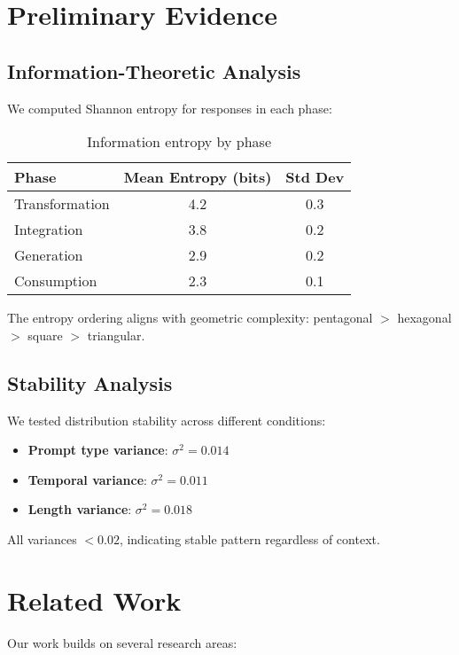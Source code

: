 \documentclass[pmlr,onecolumn]{jmlr}
\begin{document}
\section{Preliminary Evidence}

\subsection{Information-Theoretic Analysis}

We computed Shannon entropy for responses in each phase:

\begin{table}[h]
\centering
\begin{tabular}{lcc}
\hline
\textbf{Phase} & \textbf{Mean Entropy (bits)} & \textbf{Std Dev} \\
\hline
Transformation & 4.2 & 0.3 \\
Integration & 3.8 & 0.2 \\
Generation & 2.9 & 0.2 \\
Consumption & 2.3 & 0.1 \\
\hline
\end{tabular}
\caption{Information entropy by phase}
\end{table}

The entropy ordering aligns with geometric complexity: pentagonal $>$ hexagonal $>$ square $>$ triangular.

\subsection{Stability Analysis}

We tested distribution stability across different conditions:

\begin{itemize}
\item \textbf{Prompt type variance}: $\sigma^2 = 0.014$
\item \textbf{Temporal variance}: $\sigma^2 = 0.011$
\item \textbf{Length variance}: $\sigma^2 = 0.018$
\end{itemize}

All variances $< 0.02$, indicating stable pattern regardless of context.

\section{Related Work}

Our work builds on several research areas:
\end{document}
